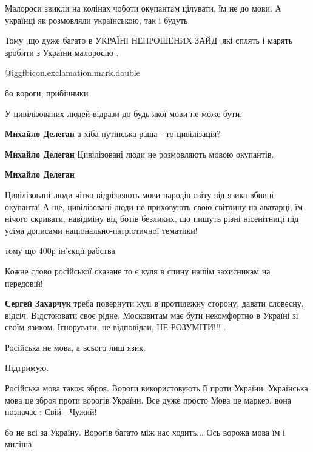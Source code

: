 \begin{itemize}
Малороси звикли на колінах чоботи окупантам цілувати, їм не до мови. А українці як розмовляли українською, так і будуть.

Тому ,що дуже багато в УКРАЇНІ НЕПРОШЕНИХ ЗАЙД ,які сплять і марять зробити з України малоросію .

@igg{fbicon.exclamation.mark.double}

бо вороги, прибічники


У цивілізованих людей відрази до будь-якої мови не може бути.

\begin{itemize} %
\textbf{Михайло Делеган} а хіба путінська раша - то цивілізація?

\textbf{Михайло Делеган} Цивілізовані люди не розмовляють мовою окупантів.

\textbf{Михайло Делеган} 

Цивілізовані люди чітко відрізняють мови народів світу від язика
вбивці-окупанта! А ще, цивілізовані люди не приховують свою світлину на
аватарці, їм нічого скривати, навідміну від ботів безликих, що пишуть різні
нісенітниці під усіма дописами національно-патріотичної тематики!

\end{itemize} %

тому що 400р ін'єкції рабства

Кожне слово російської сказане то є куля в спину нашім захисникам на передовій!

\begin{itemize} %
\textbf{Сергей Захарчук} треба повернути кулі в протилежну сторону, давати словесну, відсіч. Відстоювати своє рідне.
Московитам має бути некомфортно в Україні зі своїм язиком.
Ігнорувати, не відповідаи, НЕ РОЗУМІТИ!!! .
\end{itemize} %

Російська не мова, а всього лиш язик.

Підтримую.

Російська мова також зброя. Вороги використовують її проти України.
Українська мова це зброя проти ворогів України.
Все дуже просто
Мова це маркер, вона позначає : Свій - Чужий!

бо не всі за Україну. Ворогів багато між нас ходить... Ось ворожа мова їм і миліша.


\end{itemize}
